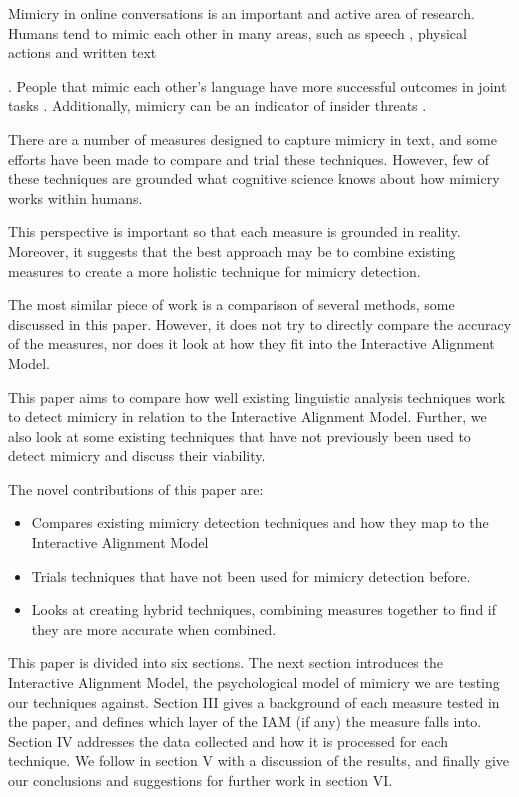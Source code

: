 \documentclass[conference]{IEEEtran}
\begin{document}
Mimicry in online conversations is an important and active area of research. Humans tend to mimic each
other in many areas, such as speech
\cite{levelt1982surface, bock1986syntactic, bock1989closed, garrod1987saying},
physical actions\cite{bernieri1988coordinated}
and written text{\cite{danescu2011chameleons, scissors2008linguistic}.
People that mimic each other's language have more successful outcomes in joint tasks
\cite{maddux2008chameleons}. Additionally, mimicry can be an indicator of insider threats
\cite{taylor2013detecting}.

There are a number of measures designed to capture mimicry in text, and some efforts have been made to
compare and trial these techniques. However, few of these techniques are grounded what cognitive 
science knows about how mimicry works within humans.

This perspective is important so that each measure is grounded in reality.
Moreover, it suggests that the best approach may be to combine existing measures to create
a more holistic technique for mimicry detection.

The most similar piece of work is a comparison of several methods\cite{xu2015evaluation}, some 
discussed in this paper. However, it does not try to directly compare the accuracy of the measures,
nor does it look at how they fit into the Interactive Alignment Model.

This paper aims to compare how well existing linguistic analysis techniques work to detect mimicry in 
relation to the Interactive Alignment Model. Further, we also look at some existing techniques that 
have not previously been used to detect mimicry and discuss their viability.

The novel contributions of this paper are:
\begin{itemize}
	\item Compares existing mimicry detection techniques and how they map to the
		  Interactive Alignment Model
	\item Trials techniques that have not been used for mimicry detection before.
	\item Looks at creating hybrid techniques, combining measures together to find if they are more 
		  accurate when combined. 
\end{itemize}

This paper is divided into six sections. The next section introduces the
Interactive Alignment Model, the psychological model of mimicry we are testing our techniques against.
Section III gives a background of each measure tested in the paper, and defines which layer of the
IAM (if any) the measure falls into.
Section IV addresses the data collected and how it is processed for each technique.
We follow in section V with a discussion of the results, and finally give our conclusions and
suggestions for further work in section VI.


}
\end{document}
